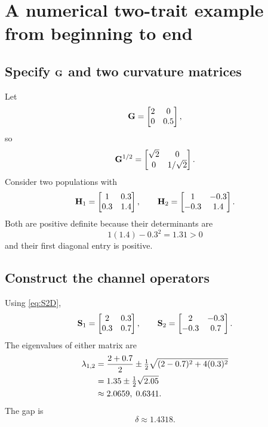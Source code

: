 \chapter{A numerical two-trait example from beginning to end}

\section{Specify \(\mathbf{G}\) and two curvature matrices}

Let
\begin{equation}
\mathbf{G}=
\begin{bmatrix}
2&0\\0&0.5
\end{bmatrix},
\end{equation}
so
\begin{equation}
\mathbf{G}^{1/2}=
\begin{bmatrix}
\sqrt2&0\\0&1/\sqrt2
\end{bmatrix}.
\end{equation}
Consider two populations with
\begin{equation}
\mathbf{H}_1=
\begin{bmatrix}
1&0.3\\0.3&1.4
\end{bmatrix},
\qquad
\mathbf{H}_2=
\begin{bmatrix}
1&-0.3\\-0.3&1.4
\end{bmatrix}.
\end{equation}
Both are positive definite because their determinants are
\begin{equation}
1(1.4)-0.3^2=1.31>0
\end{equation}
and their first diagonal entry is positive.

\section{Construct the channel operators}

Using \cref{eq:S2D},
\begin{equation}
\mathbf{S}_1=
\begin{bmatrix}
2&0.3\\0.3&0.7
\end{bmatrix},
\qquad
\mathbf{S}_2=
\begin{bmatrix}
2&-0.3\\-0.3&0.7
\end{bmatrix}.
\end{equation}
The eigenvalues of either matrix are
\begin{align}
\lambda_{1,2}
&=\frac{2+0.7}{2}
\pm\tfrac12\sqrt{(2-0.7)^2+4(0.3)^2}\\
&=1.35\pm\tfrac12\sqrt{2.05}\\
&\approx2.0659,\;0.6341.
\end{align}
The gap is
\begin{equation}
\delta\approx1.4318.
\end{equation}


